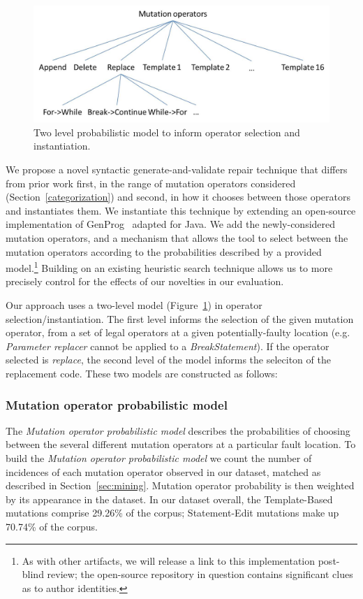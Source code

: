 \documentclass[conference]{IEEEtran}
\begin{document}
\begin{figure}[!h]
 \centering
    \includegraphics[width=\columnwidth]{Picture2}
  \caption{Two level probabilistic model to inform operator selection and instantiation. \label{fig:probModel}}
\end{figure}

We propose a novel syntactic generate-and-validate repair
technique that differs
from prior work first, in the range of mutation operators considered
(Section~\ref{categorization}) and second, in how it chooses between those
operators and instantiates them.  
We instantiate this technique by extending an open-source implementation of
GenProg~\cite{legoues12} adapted for Java.  We add the newly-considered mutation
operators, and a mechanism that allows the tool to
select between the mutation operators according to the probabilities described by
a provided model.\footnote{As with other artifacts, we will release a link to
  this implementation post-blind review; the open-source repository in question contains
  significant clues as to author identities.}
Building on an existing heuristic search technique allows us to more precisely
control for the effects of our novelties in our evaluation.  

Our approach uses a two-level model (Figure~\ref{fig:probModel}) in operator
selection/instantiation.  The first level informs the selection of the given
mutation operator, from a set of legal operators at a given potentially-faulty
location (e.g. \emph{Parameter replacer} cannot be applied to a \emph{BreakStatement}).  If the operator selected is \emph{replace}, the second level of the
model informs the seleciton of the replacement code.  These two models are
constructed as follows: 

\subsubsection{Mutation operator probabilistic model}
The \textit{Mutation operator probabilistic model} 
describes the probabilities of choosing between the several different mutation 
operators at a particular fault location.
%
To build the \textit{Mutation operator probabilistic model} 
we count the number of incidences of each mutation operator observed in our
dataset, matched as described in Section~\ref{sec:mining}. Mutation operator probability is then
weighted by its appearance in the dataset.  
%
In our dataset overall, the Template-Based mutations comprise 29.26\% of the corpus; Statement-Edit mutations make up 70.74\% of the 
corpus.
\end{document}
